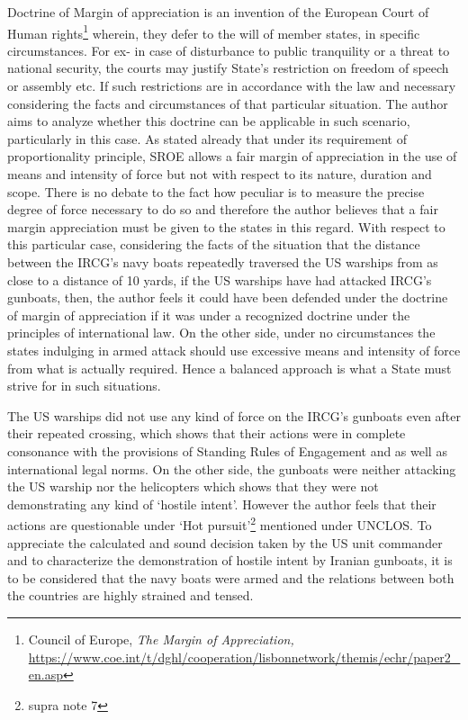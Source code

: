 \begin{multicols}{2}

\noi
Doctrine of Margin of appreciation is an invention of the European Court of Human
rights\footnote{Council of Europe, \textit{The Margin of Appreciation,}
 \url{https://www.coe.int/t/dghl/cooperation/lisbonnetwork/themis/echr/paper2_en.asp}} wherein, they defer to the will of member states, in specific circumstances. For ex- in
case of disturbance to public tranquility or a threat to national security, the courts may
justify State’s restriction on freedom of speech or assembly etc. If such restrictions are in
accordance with the law and necessary considering the facts and circumstances of that
particular situation. The author aims to analyze whether this doctrine can be applicable in
such scenario, particularly in this case. As stated already that under its requirement of
proportionality principle, SROE allows a fair margin of appreciation in the use of means and
intensity of force but not with respect to its nature, duration and scope. There is no debate to the fact how peculiar is to measure the precise degree of force necessary to do so and
therefore the author believes that a fair margin appreciation must be given to the states in
this regard. With respect to this particular case, considering the facts of the situation that the
distance between the IRCG’s navy boats repeatedly traversed the US warships from as close
to a distance of 10 yards, if the US warships have had attacked IRCG’s gunboats, then, the
author feels it could have been defended under the doctrine of margin of appreciation if it
was under a recognized doctrine under the principles of international law. On the other side,
under no circumstances the states indulging in armed attack should use excessive means
and intensity of force from what is actually required. Hence a balanced approach is what a
State must strive for in such situations.


\noi
The US warships did not use any kind of force on the IRCG’s gunboats even after their
repeated crossing, which shows that their actions were in complete consonance with the
provisions of Standing Rules of Engagement and as well as international legal norms. On
the other side, the gunboats were neither attacking the US warship nor the helicopters which
shows that they were not demonstrating any kind of ‘hostile intent’. However the author
feels that their actions are questionable under ‘Hot pursuit’\footnote{supra note 7} mentioned under UNCLOS. To
appreciate the calculated and sound decision taken by the US unit commander and to
characterize the demonstration of hostile intent by Iranian gunboats, it is to be considered
that the navy boats were armed and the relations between both the countries are highly
strained and tensed. 


\end{multicols}
